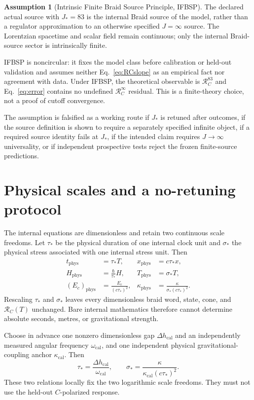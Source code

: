 \documentclass[11pt]{article}
\theoremstyle{definition}
\newtheorem{assumption}[theorem]{Assumption}
\theoremstyle{remark}
\newcommand{\RC}{\mathcal{R}_{C}}
\begin{document}
\begin{assumption}[Intrinsic Finite Braid Source Principle, IFBSP]\label{ass:ifbsp}
The declared actual source with $J_*=83$ is the internal Braid source of the model, rather than a regulator approximation to an otherwise specified $J=\infty$ source. The Lorentzian spacetime and scalar field remain continuous; only the internal Braid-source sector is intrinsically finite.
\end{assumption}

IFBSP is noncircular: it fixes the model class before calibration or held-out validation and assumes neither Eq.~\eqref{eq:RCslope} as an empirical fact nor agreement with data. Under IFBSP, the theoretical observable is $\RC^{83}$ and Eq.~\eqref{eq:error} contains no undefined $\RC^\infty$ residual. This is a finite-theory choice, not a proof of cutoff convergence.

The assumption is falsified as a working route if $J_*$ is retuned after outcomes, if the source definition is shown to require a separately specified infinite object, if a required source identity fails at $J_*$, if the intended claim requires $J\to\infty$ universality, or if independent prospective tests reject the frozen finite-source predictions.

\section{Physical scales and a no-retuning protocol}

The internal equations are dimensionless and retain two continuous scale freedoms. Let $\tau_*$ be the physical duration of one internal clock unit and $\sigma_*$ the physical stress associated with one internal stress unit. Then
\begin{align}
 t_{\mathrm{phys}}&=\tau_*T,&
 x_{\mathrm{phys}}&=c\tau_*x,\\
 H_{\mathrm{phys}}&=\frac{\hbar}{\tau_*}H,&
 T_{\mathrm{phys}}&=\sigma_*T,\\
 (E_c)_{\mathrm{phys}}&=\frac{E_c}{(c\tau_*)^2},&
 \kappa_{\mathrm{phys}}&=\frac{\kappa}{\sigma_*(c\tau_*)^2}.
\end{align}
Rescaling $\tau_*$ and $\sigma_*$ leaves every dimensionless braid word, state, cone, and $\RC(T)$ unchanged. Bare internal mathematics therefore cannot determine absolute seconds, metres, or gravitational strength.

Choose in advance one nonzero dimensionless gap $\Delta h_{\mathrm{cal}}$ and an independently measured angular frequency $\omega_{\mathrm{cal}}$, and one independent physical gravitational-coupling anchor $\kappa_{\mathrm{cal}}$. Then
\begin{equation}
 \tau_*=\frac{\Delta h_{\mathrm{cal}}}{\omega_{\mathrm{cal}}},
 \qquad
 \sigma_*=\frac{\kappa}{\kappa_{\mathrm{cal}}(c\tau_*)^2}.
\end{equation}
These two relations locally fix the two logarithmic scale freedoms. They must not use the held-out $C$-polarized response.
\end{document}
